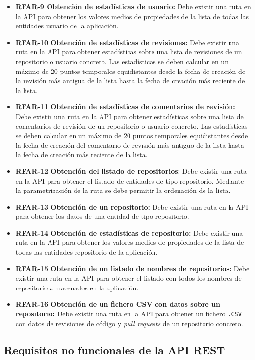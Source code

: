 \begin{itemize}
	\item \textbf{RFAR-9 Obtención de estadísticas de usuario:} Debe existir una ruta en la API para obtener los valores medios de propiedades de la lista de todas las entidades usuario de la aplicación.
	\item \textbf{RFAR-10 Obtención de estadísticas de revisiones:} Debe existir una ruta en la API para obtener estadísticas sobre una lista de revisiones de un repositorio o usuario concreto. Las estadísticas se deben calcular en un máximo de 20 puntos temporales equidistantes desde la fecha de creación de la revisión más antigua de la lista hasta la fecha de creación más reciente de la lista.
	\item \textbf{RFAR-11 Obtención de estadísticas de comentarios de revisión:} Debe existir una ruta en la API para obtener estadísticas sobre una lista de comentarios de revisión de un repositorio o usuario concreto. Las estadísticas se deben calcular en un máximo de 20 puntos temporales equidistantes desde la fecha de creación del comentario de revisión más antiguo de la lista hasta la fecha de creación más reciente de la lista.
	\item \textbf{RFAR-12 Obtención del listado de repositorios:} Debe existir una ruta en la API para obtener el listado de entidades de tipo repositorio. Mediante la parametrización de la ruta se debe permitir la ordenación de la lista.
	\item \textbf{RFAR-13 Obtención de un repositorio:} Debe existir una ruta en la API para obtener los datos de una entidad de tipo repositorio.
	\item \textbf{RFAR-14 Obtención de estadísticas de repositorio:} Debe existir una ruta en la API para obtener los valores medios de propiedades de la lista de todas las entidades repositorio de la aplicación.
	\item \textbf{RFAR-15 Obtención de un listado de nombres de repositorios:} Debe existir una ruta en la API para obtener el listado con todos los nombres de repositorio almacenados en la aplicación.
	\item \textbf{RFAR-16 Obtención de un fichero CSV con datos sobre un repositorio:} Debe existir una ruta en la API para obtener un fichero \texttt{.CSV} con datos de revisiones de código y \textit{pull requests} de un repositorio concreto.
\end{itemize}

\subsection{Requisitos no funcionales de la API REST}

